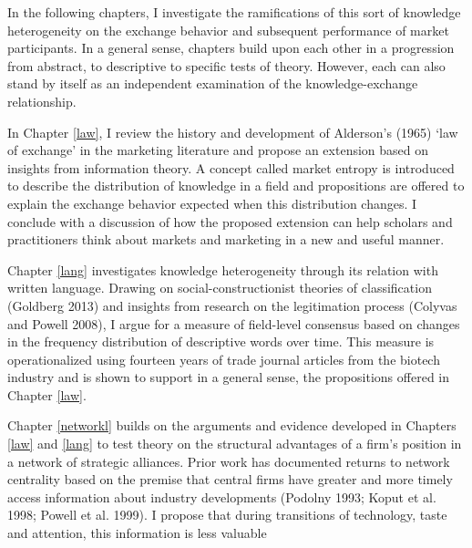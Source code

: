 In the following chapters, I investigate the ramifications of this sort of knowledge heterogeneity on the exchange behavior and subsequent performance of market participants. In a general sense, chapters build upon each other in a progression from abstract, to descriptive to specific tests of theory. However, each can also stand by itself as an independent examination of the knowledge-exchange relationship. 

In Chapter \ref{law}, I review the history and development of Alderson's (1965) `law of exchange' in the marketing literature and propose an extension based on insights from information theory. A concept called market entropy is introduced to describe the distribution of knowledge in a field and propositions are offered to explain the exchange behavior expected when this distribution changes. I conclude with a discussion of how the proposed extension can help scholars and practitioners think about markets and marketing in a new and useful manner. 

Chapter \ref{lang} investigates knowledge heterogeneity through its relation with written language. Drawing on social-constructionist theories of classification (Goldberg 2013) and insights from research on the legitimation process (Colyvas and Powell 2008), I argue for a measure of field-level consensus based on changes in the frequency distribution of descriptive words over time. This measure is operationalized using fourteen years of trade journal articles from the biotech industry and is shown to support in a general sense, the propositions offered in Chapter \ref{law}. 

Chapter \ref{networkl} builds on the arguments and evidence developed in Chapters \ref{law} and \ref{lang} to test theory on the structural advantages of a firm's position in a network of strategic alliances. Prior work has documented returns to network centrality based on the premise that central firms have greater and more timely access information about industry developments (Podolny 1993; Koput et al. 1998; Powell et al. 1999). I propose that during transitions of technology, taste and attention, this information is less valuable

